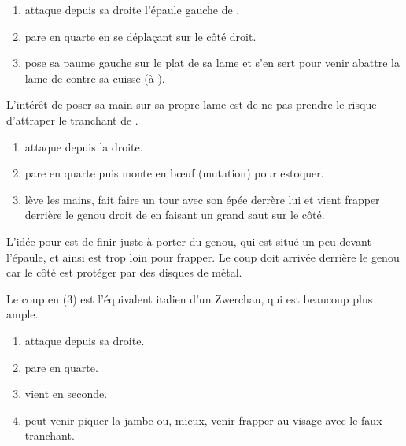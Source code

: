 \begin{technique}

\begin{enumerate}
	\item \A attaque depuis sa droite l'épaule gauche de \D.
	\item \D pare en quarte en se déplaçant sur le côté droit.
	\item \D pose sa paume gauche sur le plat de sa lame et s'en sert pour venir abattre la lame de \A contre sa cuisse (à \D).
\end{enumerate}

L'intérêt de poser sa main sur sa propre lame est de ne pas prendre le risque d'attraper le tranchant de \A.

\end{technique}


\begin{technique}

\begin{enumerate}
	\item \A attaque depuis la droite.
	\item \D pare en quarte puis monte en bœuf (mutation) pour estoquer.
	\item \A lève les mains, fait faire un tour avec son épée derrère lui et vient frapper derrière le genou droit de \D en faisant un grand saut sur le côté.
\end{enumerate}

L'idée pour \A est de finir juste à porter du genou, qui est situé un peu devant l'épaule, et ainsi \D est trop loin pour frapper.
Le coup doit arrivée derrière le genou car le côté est protéger par des disques de métal.

Le coup en (3) est l'équivalent italien d'un Zwerchau, qui est beaucoup plus ample.

\end{technique}


\begin{technique}

\begin{enumerate}
	\item \A attaque depuis sa droite.
	\item \D pare en quarte.
	\item \D vient en seconde.
	\item \D peut venir piquer la jambe ou, mieux, venir frapper au visage avec le faux tranchant.
\end{enumerate}
\end{technique}


